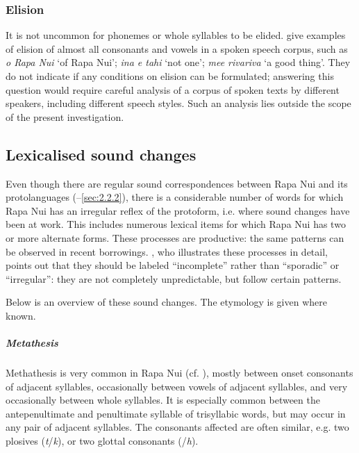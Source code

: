 \subsubsection[Elision]{Elision}\label{sec:2.5.1.3}
It is not uncommon for phonemes or whole syllables to be elided. \citet[45–47]{GuerraEissmann1993} give examples of elision of almost all consonants and vowels in a spoken speech corpus, such as \textit{o Rapa Nui} \textstyleIPA{[oˈrapaːi]} ‘of Rapa Nui’; \textit{{\ꞌ}ina e tahi} \textstyleIPA{[inaˈtai]} ‘not one’; \textit{me{\ꞌ}e rivariva} \textstyleIPA{[meːriːˈriːa]} ‘a good thing’. They do not indicate if any conditions on elision can be formulated; answering this question would require careful analysis of a corpus of spoken texts by different speakers, including different speech styles. Such an analysis lies outside the scope of the present investigation.

\subsection{Lexicalised sound changes}\label{sec:2.5.2}

Even though there are regular sound correspondences between Rapa Nui and its protolanguages (–\ref{sec:2.2.2}), there is a considerable number of words for which Rapa Nui has an irregular reflex of the protoform, i.e. where sound changes have been at work. This includes numerous lexical items for which Rapa Nui has two or more alternate forms. These processes are productive: the same patterns can be observed in recent borrowings. \citet{Davletshin2015}, who illustrates these processes in detail, points out that they should be labeled “incomplete” rather than “sporadic” or “irregular”: they are not completely unpredictable, but follow certain patterns. 

Below is an overview of these sound changes. The etymology is given where known.

\subparagraph{Metathesis} Methathesis is very common in Rapa Nui (cf. \citealt[166]{DuFeuFischer1993}), mostly between onset consonants of adjacent syllables, occasionally between vowels of adjacent syllables, and very occasionally between whole syllables. It is especially common between the antepenultimate and penultimate syllable of trisyllabic words, but may occur in any pair of adjacent syllables. The consonants affected are often similar, e.g. two plosives (\textit{t}/\textit{k}), or two glottal consonants (\textit{{\ꞌ}}/\textit{h}).

